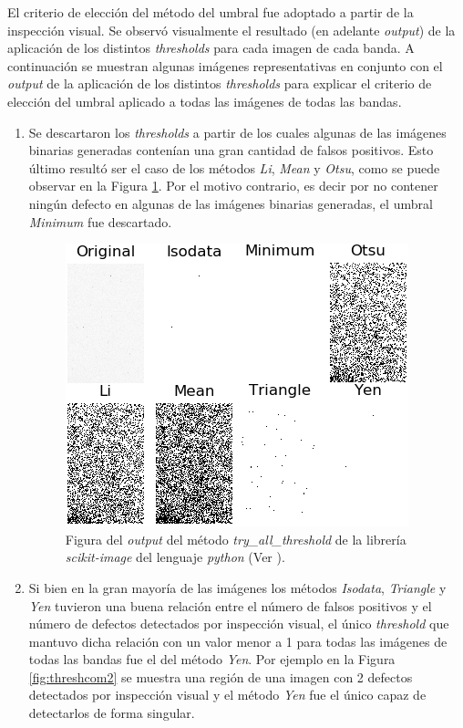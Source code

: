 El criterio de elección del método del umbral fue adoptado a partir de la inspección visual. Se observó visualmente el resultado (en adelante \textit{output}) de la aplicación de los distintos \textit{thresholds} para cada imagen de cada banda. A continuación se muestran algunas imágenes representativas en conjunto con el \textit{output} de la aplicación de los distintos \textit{thresholds} para explicar el criterio de elección del umbral aplicado a todas las imágenes de todas las bandas.
\begin{enumerate}
\justifying
\item Se descartaron los \textit{thresholds} a partir de los cuales algunas de las imágenes binarias generadas contenían una gran cantidad de falsos positivos. Esto último resultó ser el caso de los métodos \textit{Li}\cite{Lie}, \textit{Mean}\cite{Glasmean} y \textit{Otsu}\cite{otsuu}, como se puede observar en la Figura \ref{fig:threshcom}. Por el motivo contrario, es decir por no contener ningún defecto en algunas de las imágenes binarias generadas, el umbral \textit{Minimum}\cite{pericles} fue descartado.
\begin{figure}[H]
	\centering
	\includegraphics[scale=2.3]{Figs/defectosZEISS/thresh_comparison.png}
	\caption{Figura del \textit{output} del método \textit{try\_all\_threshold} de la librería \textit{scikit-image} del lenguaje \textit{python} (Ver \href{https://github.com/jrr1984/defects_analysis/blob/master/MAIN/try_all_thresholds.py}{\faGithub}).} 
	\label{fig:threshcom}
\end{figure}

\item Si bien en la gran mayoría de las imágenes los métodos \textit{Isodata}\cite{ridler}, \textit{Triangle}\cite{triang} y \textit{Yen}\cite{yen} tuvieron una buena relación entre el número de falsos positivos y el número de defectos detectados por inspección visual, el único \textit{threshold} que mantuvo dicha relación con un valor menor a 1 para todas las imágenes de todas las bandas fue el del método \textit{Yen}. Por ejemplo en la Figura \ref{fig:threshcom2} se muestra una región de una imagen con 2 defectos detectados por inspección visual y el método \textit{Yen} fue el único capaz de detectarlos de forma singular.


\end{enumerate}
